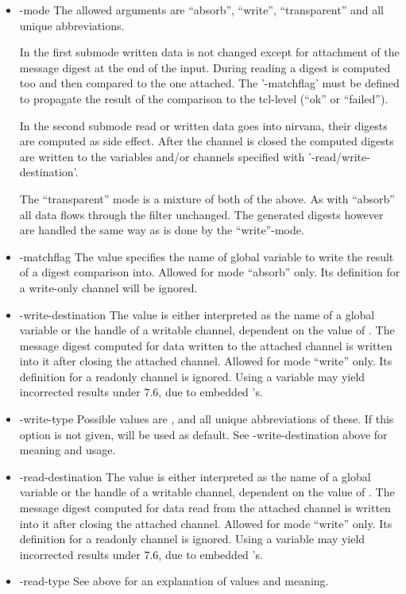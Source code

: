 \documentclass {report}
\begin{document}
\begin {itemize}
\item [-mode]
	The allowed arguments are ``absorb'', ``write'',
	``transparent'' and all unique abbreviations. 

	In the first submode written data is not changed except for
	attachment of the message digest at the end of the
	input. During reading a digest is computed too and then
	compared to the one attached. The '-matchflag' must be defined
	to propagate the result of the comparison to the tcl-level
	(``ok'' or ``failed'').

	In the second submode read or written data goes into nirvana,
	their digests are computed as side effect. After the channel
	is closed the computed digests are written to the variables
	and/or channels specified with '-read/write-destination'.

	The ``transparent'' mode is a mixture of both of the above. As
	with ``absorb'' all data flows through the filter
	unchanged. The generated digests however are handled the same
	way as is done by the ``write''-mode.


\item [-matchflag]
	The value specifies the name of global variable to write the
	result of a digest comparison into. Allowed for mode
	``absorb'' only. Its definition for a write-only channel will
	be ignored. 

\item [-write-destination]
	The value is either interpreted as the name of a global
	variable or the handle of a writable channel, dependent on the
	value of . The message digest computed for
	data written to the attached channel is written into it after
	closing the attached channel. Allowed for mode ``write''
	only. Its definition for a readonly channel is ignored. Using
	a variable may yield incorrected results under \tcl{} 7.6, due
	to embedded \strterm's. 

\item [-write-type]
	Possible values are ,  and
	all unique abbreviations of these. If this option is not
	given,  will be used as default. See \opt
	{-write-destination} above for meaning and usage.

\item [-read-destination]
	The value is either interpreted as the name of a global
	variable or the handle of a writable channel, dependent on the
	value of . The message digest computed for
	data read from the attached channel is written into it after
	closing the attached channel. Allowed for mode ``write''
	only. Its definition for a readonly channel is ignored. Using
	a variable may yield incorrected results under \tcl{} 7.6, due
	to embedded \strterm's.

\item [-read-type]
	See  above for an explanation of values and meaning.
\end   {itemize}
\end{document}
